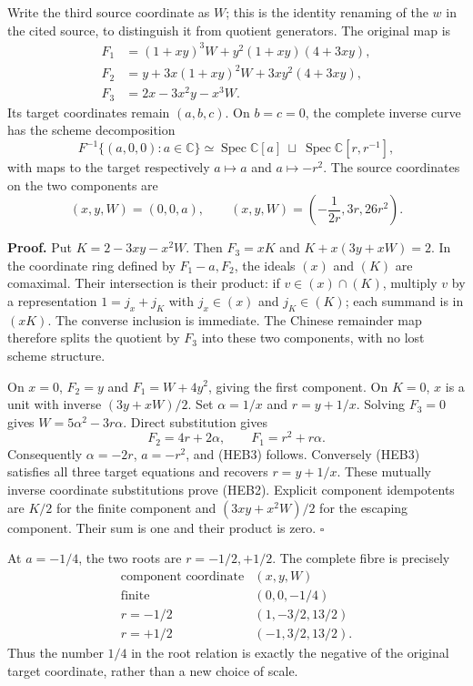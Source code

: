 \documentclass[
  10pt,
  a4paper,
]{article}
\begin{document}
Write the third source coordinate as \(W\); this is the identity
renaming of the \(w\) in the cited source, to distinguish it from
quotient generators. The original map is \[
\begin{aligned}
F_1&=(1+xy)^3W+y^2(1+xy)(4+3xy),\\
F_2&=y+3x(1+xy)^2W+3xy^2(4+3xy),\\
F_3&=2x-3x^2y-x^3W.
\end{aligned}\tag{HEB1}
\] Its target coordinates remain \((a,b,c)\). On \(b=c=0\), the complete
inverse curve has the scheme decomposition \[
F^{-1}\{(a,0,0):a\in\mathbb C\}
\simeq\operatorname{Spec}\mathbb C[a]\ \sqcup\ 
\operatorname{Spec}\mathbb C[r,r^{-1}],
\tag{HEB2}
\] with maps to the target respectively \(a\mapsto a\) and
\(a\mapsto-r^2\). The source coordinates on the two components are \[
(x,y,W)=(0,0,a),\qquad
(x,y,W)=\left(-\frac1{2r},3r,26r^2\right).
\tag{HEB3}
\]

\textbf{Proof.} Put \(K=2-3xy-x^2W\). Then \(F_3=xK\) and
\(K+x(3y+xW)=2\). In the coordinate ring defined by \(F_1-a,F_2\), the
ideals \((x)\) and \((K)\) are comaximal. Their intersection is their
product: if \(v\in(x)\cap(K)\), multiply \(v\) by a representation
\(1=j_x+j_K\) with \(j_x\in(x)\) and \(j_K\in(K)\); each summand is in
\((xK)\). The converse inclusion is immediate. The Chinese remainder map
therefore splits the quotient by \(F_3\) into these two components, with
no lost scheme structure.

On \(x=0\), \(F_2=y\) and \(F_1=W+4y^2\), giving the first component. On
\(K=0\), \(x\) is a unit with inverse \((3y+xW)/2\). Set \(\alpha=1/x\)
and \(r=y+1/x\). Solving \(F_3=0\) gives \(W=5\alpha^2-3r\alpha\).
Direct substitution gives \[
F_2=4r+2\alpha,\qquad F_1=r^2+r\alpha.
\tag{HEB4}
\] Consequently \(\alpha=-2r\), \(a=-r^2\), and (HEB3) follows.
Conversely (HEB3) satisfies all three target equations and recovers
\(r=y+1/x\). These mutually inverse coordinate substitutions prove
(HEB2). Explicit component idempotents are \(K/2\) for the finite
component and \((3xy+x^2W)/2\) for the escaping component. Their sum is
one and their product is zero. \(\square\)

At \(a=-1/4\), the two roots are \(r=-1/2,+1/2\). The complete fibre is
precisely \[
\begin{array}{c|c}
\text{component coordinate}&(x,y,W)\\\hline
\text{finite}&(0,0,-1/4)\\
r=-1/2&(1,-3/2,13/2)\\
r=+1/2&(-1,3/2,13/2).
\end{array}\tag{HEB5}
\] Thus the number \(1/4\) in the root relation is exactly the negative
of the original target coordinate, rather than a new choice of scale.
\end{document}
